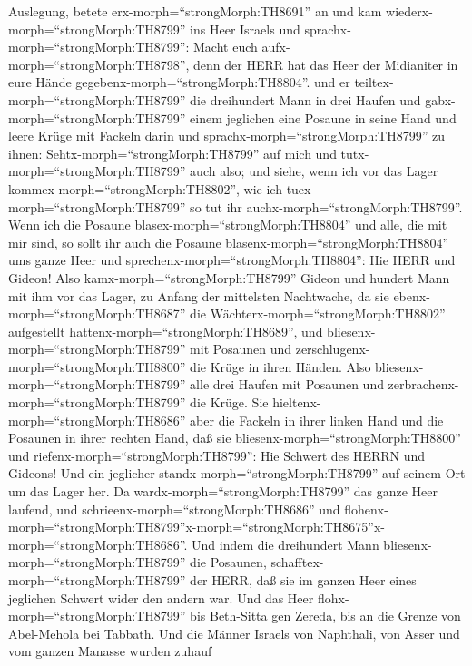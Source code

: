 Auslegung, betete erx-morph=``strongMorph:TH8691'' an und kam
wiederx-morph=``strongMorph:TH8799'' ins Heer Israels und
sprachx-morph=``strongMorph:TH8799'': Macht euch
aufx-morph=``strongMorph:TH8798'', denn der HERR hat das Heer der
Midianiter in eure Hände gegebenx-morph=``strongMorph:TH8804''.
 und er teiltex-morph=``strongMorph:TH8799'' die
dreihundert Mann in drei Haufen und gabx-morph=``strongMorph:TH8799''
einem jeglichen eine Posaune in seine Hand und leere Krüge mit Fackeln
darin  und sprachx-morph=``strongMorph:TH8799'' zu ihnen:
Sehtx-morph=``strongMorph:TH8799'' auf mich und
tutx-morph=``strongMorph:TH8799'' auch also; und siehe, wenn ich vor das
Lager kommex-morph=``strongMorph:TH8802'', wie ich
tuex-morph=``strongMorph:TH8799'' so tut ihr
auchx-morph=``strongMorph:TH8799''.  Wenn ich die Posaune
blasex-morph=``strongMorph:TH8804'' und alle, die mit mir sind, so sollt
ihr auch die Posaune blasenx-morph=``strongMorph:TH8804'' ums ganze Heer
und sprechenx-morph=``strongMorph:TH8804'': Hie HERR und Gideon!
 Also kamx-morph=``strongMorph:TH8799'' Gideon und hundert
Mann mit ihm vor das Lager, zu Anfang der mittelsten Nachtwache, da sie
ebenx-morph=``strongMorph:TH8687'' die
Wächterx-morph=``strongMorph:TH8802'' aufgestellt
hattenx-morph=``strongMorph:TH8689'', und
bliesenx-morph=``strongMorph:TH8799'' mit Posaunen und
zerschlugenx-morph=``strongMorph:TH8800'' die Krüge in ihren Händen.
 Also bliesenx-morph=``strongMorph:TH8799'' alle drei
Haufen mit Posaunen und zerbrachenx-morph=``strongMorph:TH8799'' die
Krüge. Sie hieltenx-morph=``strongMorph:TH8686'' aber die Fackeln in
ihrer linken Hand und die Posaunen in ihrer rechten Hand, daß sie
bliesenx-morph=``strongMorph:TH8800'' und
riefenx-morph=``strongMorph:TH8799'': Hie Schwert des HERRN und Gideons!
 Und ein jeglicher standx-morph=``strongMorph:TH8799'' auf
seinem Ort um das Lager her. Da wardx-morph=``strongMorph:TH8799'' das
ganze Heer laufend, und schrieenx-morph=``strongMorph:TH8686'' und
flohenx-morph=``strongMorph:TH8799''\textbar x-morph=``strongMorph:TH8675''x-morph=``strongMorph:TH8686''.
 Und indem die dreihundert Mann
bliesenx-morph=``strongMorph:TH8799'' die Posaunen,
schafftex-morph=``strongMorph:TH8799'' der HERR, daß sie im ganzen Heer
eines jeglichen Schwert wider den andern war. Und das Heer
flohx-morph=``strongMorph:TH8799'' bis Beth-Sitta gen Zereda, bis an die
Grenze von Abel-Mehola bei Tabbath.  Und die Männer Israels
von Naphthali, von Asser und vom ganzen Manasse wurden zuhauf

